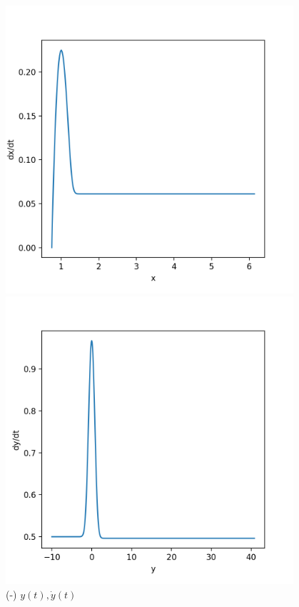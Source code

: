 \documentclass[a4paper,12pt]{article}
\begin{document}
\begin{figure}[H]
	\centering
	\begin{minipage}{0.5\textwidth}
		\centering
		\includegraphics[width=0.95\textwidth]{./phase-og-3signed.png}
		\caption{ (-) $x(t), \dot{x}(t)$ }
	\end{minipage}\hfill
	\begin{minipage}{0.5\textwidth}
		\centering
		\includegraphics[width=0.95\textwidth]{./phase-og-4signed.png}
		\caption{ (-) $y(t), \dot{y}(t)$ }
	\end{minipage}
\end{figure}
\end{document}
